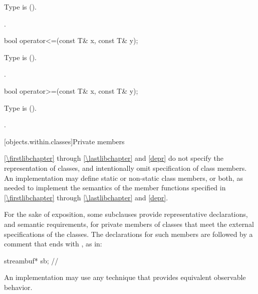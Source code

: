 \begin{itemdescr}
\pnum
\requires
Type  is  ().

\pnum
\returns
{}.
\end{itemdescr}

%
\begin{itemdecl}
bool operator<=(const T& x, const T& y);
\end{itemdecl}

\begin{itemdescr}
\pnum
\requires
Type  is  ().

\pnum
\returns
{}.
\end{itemdescr}

%
\begin{itemdecl}
bool operator>=(const T& x, const T& y);
\end{itemdecl}

\begin{itemdescr}
\pnum
\requires
Type  is  ().

\pnum
\returns
{}.
\end{itemdescr}

[objects.within.classes]{Private members}

\pnum
\ref{\firstlibchapter} through \ref{\lastlibchapter} and
\ref{depr} do not specify the representation of classes, and intentionally
omit specification of class members. An implementation may
define static or non-static class members, or both, as needed to implement the
semantics of the member functions specified in \ref{\firstlibchapter}
through \ref{\lastlibchapter} and \ref{depr}.

\pnum
For the sake of exposition,
some subclauses provide representative declarations, and semantic requirements, for
private members of classes that meet the external specifications of the classes.
The declarations for such members are
followed by a comment that ends with \expos, as in:

\begin{codeblock}
streambuf* sb;  // \expos
\end{codeblock}

\pnum
An implementation may use any technique that provides equivalent observable behavior.

